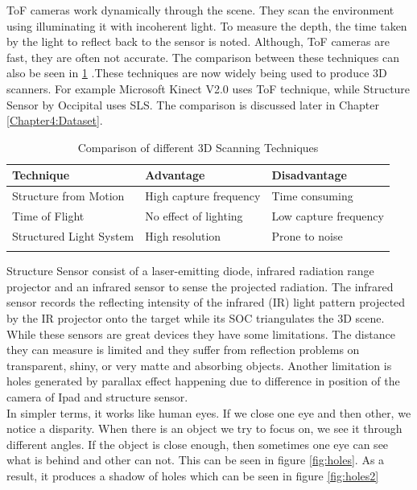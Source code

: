 ToF cameras work dynamically through the scene. They scan the environment using illuminating it with incoherent light. To measure the depth, the time taken by the light to reflect back to the sensor is noted. Although, ToF cameras are fast, they are often not accurate. The comparison between these techniques can also be seen in \ref{table:3DScanning} .These techniques are now widely being used to produce 3D scanners. For example Microsoft Kinect V2.0 uses ToF technique, while Structure Sensor by Occipital uses SLS. The comparison is discussed later in Chapter \ref{Chapter4:Dataset}.\\

\begin{table}[h]
\begin{tabular}{@{}lll@{}}
\toprule
\textbf{Technique}                    & \textbf{Advantage}           & \textbf{Disadvantage}         \\ \midrule
Structure from Motion          & High capture frequency & Time consuming                 \\
Time of Flight       & No effect of lighting & Low capture frequency     \\
Structured Light System        & High resolution   & Prone to noise                 \\ 
                            &                     &                                               
\end{tabular}
\caption{Comparison of different 3D Scanning Techniques}
\label{table:3DScanning}
\end{table}


Structure Sensor consist of a laser-emitting diode, infrared radiation range projector and an infrared sensor to sense the projected radiation. The infrared sensor records the reflecting intensity of the infrared (IR) light pattern projected by the IR projector onto the target while its  SOC triangulates the 3D scene. \cite{Kalantari} While these sensors are great devices they have some limitations. The distance they can measure is limited and they suffer from reflection problems on transparent, shiny, or very matte and absorbing objects. Another limitation is holes generated by parallax effect happening due to difference in position of the camera of Ipad and structure sensor.\\



In simpler terms, it works like human eyes. If we close one eye and then other, we notice a disparity. When there is an object we try to focus on, we see it through different angles. If the object is close enough, then sometimes one eye can see what is behind and other can not. This can be seen in figure \ref{fig:holes}. As a result, it produces a shadow of holes which can be seen in figure \ref{fig:holes2}\\


